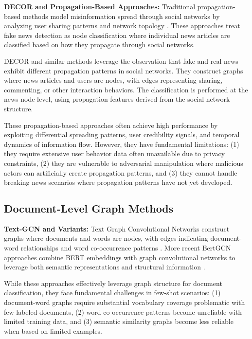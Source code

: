 \textbf{DECOR and Propagation-Based Approaches:} Traditional propagation-based methods model misinformation spread through social networks by analyzing user sharing patterns and network topology \cite{shu2017fake, zhou2020survey}. These approaches treat fake news detection as node classification where individual news articles are classified based on how they propagate through social networks.

DECOR and similar methods leverage the observation that fake and real news exhibit different propagation patterns in social networks. They construct graphs where news articles and users are nodes, with edges representing sharing, commenting, or other interaction behaviors. The classification is performed at the news node level, using propagation features derived from the social network structure.

These propagation-based approaches often achieve high performance by exploiting differential spreading patterns, user credibility signals, and temporal dynamics of information flow. However, they have fundamental limitations: (1) they require extensive user behavior data often unavailable due to privacy constraints, (2) they are vulnerable to adversarial manipulation where malicious actors can artificially create propagation patterns, and (3) they cannot handle breaking news scenarios where propagation patterns have not yet developed.

\subsection{Document-Level Graph Methods}

\textbf{Text-GCN and Variants:} Text Graph Convolutional Networks construct graphs where documents and words are nodes, with edges indicating document-word relationships and word co-occurrence patterns \cite{yao2019graph}. More recent BertGCN approaches combine BERT embeddings with graph convolutional networks to leverage both semantic representations and structural information \cite{lin2021bertgcn}.

While these approaches effectively leverage graph structure for document classification, they face fundamental challenges in few-shot scenarios: (1) document-word graphs require substantial vocabulary coverage problematic with few labeled documents, (2) word co-occurrence patterns become unreliable with limited training data, and (3) semantic similarity graphs become less reliable when based on limited examples.

